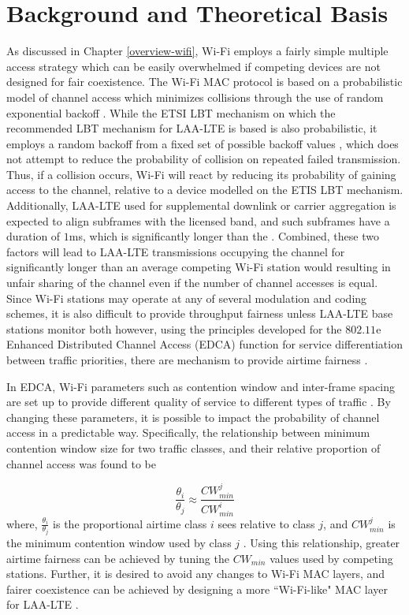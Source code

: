 \section{Background and Theoretical Basis}
\label{background}
As discussed in Chapter \ref{overview-wifi}, \mbox{Wi-Fi} employs a fairly simple multiple access strategy which can be easily overwhelmed if competing devices are not designed for fair coexistence. The \mbox{Wi-Fi}  MAC protocol is based on a probabilistic model of channel access which minimizes collisions through the use of random exponential backoff \cite{80211}.  While the ETSI LBT mechanism on which the recommended LBT mechanism for \mbox{LAA-LTE} is based is also probabilistic, it employs a random backoff from a fixed set of possible backoff values \cite{3gpp}, which does not attempt to reduce the probability of collision on repeated failed transmission.  Thus, if a collision occurs, \mbox{Wi-Fi} will react by reducing its probability of gaining access to the channel, relative to a device modelled on the ETIS LBT mechanism.  Additionally, \mbox{LAA-LTE} used for supplemental downlink or carrier aggregation is expected to align subframes with the licensed band, and such subframes have a duration of $1$ms, which is significantly longer than the .  Combined, these two factors will lead to \mbox{LAA-LTE} transmissions occupying the channel for significantly longer than an average competing \mbox{Wi-Fi} station would resulting in unfair sharing of the channel even if the number of channel accesses is equal.  Since \mbox{Wi-Fi} stations may operate at any of several modulation and coding schemes, it is also difficult to provide throughput fairness  unless \mbox{LAA-LTE} base stations monitor both however, using the principles developed for the $802.11$e Enhanced Distributed Channel Access (EDCA) function for service differentiation between traffic priorities, there are mechanism to provide airtime fairness \cite{80211}.  

In EDCA, \mbox{Wi-Fi} parameters such as contention window and inter-frame spacing are set up to provide different quality of service to different types of traffic \cite{80211}.  By changing these parameters, it is possible to impact the probability of channel access in a predictable way.  Specifically, the relationship between minimum contention window size for two traffic classes, and their relative proportion of channel access was found to be 

\begin{equation}\label{cw}
\frac{\theta_i}{\theta_j} \approx \frac{CW^j_{min}}{CW^i_{min}}
\end{equation}
where, $\frac{\theta_i}{\theta_j}$ is the proportional airtime class $i$ sees relative to class $j$, and $CW^j_{min}$ is the minimum contention window used by class $j$ \cite{yoon,chou}.  Using this relationship, greater airtime fairness can be achieved by tuning the $CW_{min}$ values used by competing stations. Further, it is desired to avoid any changes to \mbox{Wi-Fi} MAC layers, and fairer coexistence can be achieved by designing a more \mbox{``\mbox{Wi-Fi}-like"} MAC layer for \mbox{LAA-LTE} \cite{kwan}.

